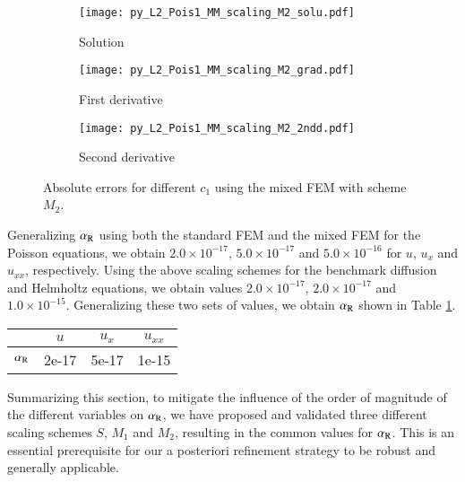 \documentclass[review,3p]{elsarticle}
\begin{document}
\begin{figure}[!ht]
    \begin{subfigure}{5.5cm}
        \texttt{[image: py\_L2\_Pois1\_MM\_scaling\_M2\_solu.pdf]}
        \caption{Solution}
        \label{py_L2_Pois1_MM_scaling_M2_solu}
    \end{subfigure}
    \hspace{-0.2cm}
    \begin{subfigure}{5.5cm}
        \texttt{[image: py\_L2\_Pois1\_MM\_scaling\_M2\_grad.pdf]}
        \caption{First derivative}
        \label{py_L2_Pois1_MM_scaling_M2_grad}
    \end{subfigure}
    \hspace{-0.2cm}
    \begin{subfigure}{5.5cm}
        \texttt{[image: py\_L2\_Pois1\_MM\_scaling\_M2\_2ndd.pdf]}
        \caption{Second derivative}
        \label{py_L2_Pois1_MM_scaling_M2_2ndd}
    \end{subfigure}
\caption{Absolute errors for different $c_1$ using the mixed FEM with scheme $M_2$.}
\label{Pois_pLov2pi2sin_MM_rhs M2}
\end{figure}


Generalizing $\alpha_{\rm R}$ using both the standard FEM and the mixed FEM for the Poisson equations, we obtain $2.0\times10^{-17}$, $5.0\times10^{-17}$ and $5.0\times10^{-16}$ for $u$, $u_{x}$ and $u_{xx}$, respectively. Using the above scaling schemes for the benchmark diffusion and Helmholtz equations, we obtain values $2.0\times10^{-17}$, $2.0\times10^{-17}$ and $1.0\times10^{-15}$.
Generalizing these two sets of values, we obtain $\alpha_{\rm R}$ shown in Table \ref{value_alpha_R_generalized}.

\begin{table}[!ht]
\centering
\begin{tabular}{c c c c}
\hline
 & $u$ & $u_x$ & $u_{xx}$ \\ \hline 
$\alpha_{\rm R}$ & 2e-17 & 5e-17 & 1e-15 \\ \hline
\end{tabular}
\label{value_alpha_R_generalized}
\end{table}


Summarizing this section, to mitigate the influence of the order of magnitude of the different variables on $\alpha_{\rm R}$, we have proposed and validated three different scaling schemes $S$, $M_1$ and $M_2$, resulting in the common values for $\alpha_{\rm R}$.
This is an essential prerequisite for our a posteriori refinement strategy to be robust and generally applicable.
\end{document}
